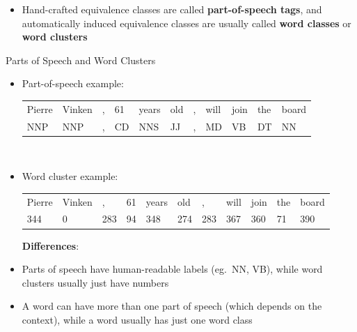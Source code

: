 \documentclass[xcolor=pdftex,x11names,table,hyperref]{beamer}
\begin{document}
\begin{frame}{}
\begin{itemize}
	\item Hand-crafted equivalence classes are called \textbf{part-of-speech tags}, and automatically induced equivalence classes are usually called \textbf{word classes} or \textbf{word clusters}
\end{itemize}
\end{frame}

\begin{frame}{Parts of Speech and Word Clusters}
\begin{itemize}
	\item Part-of-speech example: \\[0.7em]
		\begin{scriptsize}
		\begin{tabular}{lllllllllll}
			Pierre & Vinken & , & 61 & years & old & , & will & join & the & board \\
			NNP & NNP & , & CD & NNS & JJ & , & MD & VB & DT & NN \\
		\end{tabular}
	\end{scriptsize} \\[1.0em]

	\item Word cluster example: \\[0.7em]
		\begin{scriptsize}
		\begin{tabular}{lllllllllll}
			Pierre & Vinken & , & 61 & years & old & , & will & join & the & board \\
			344 & 0 & 283 & 94 & 348 & 274 & 283 & 367 & 360 & 71 & 390 \\[0.8em]
		\end{tabular}
		\end{scriptsize}
	\pause
	\hspace*{-1.5em}\textbf{Differences}:
	\item Parts of speech have human-readable labels (eg.\ NN, VB), while word clusters usually just have numbers
	\item A word can have more than one part of speech (which depends on the context), while a word usually has just one word class
\end{itemize}
\end{frame}
\end{document}
